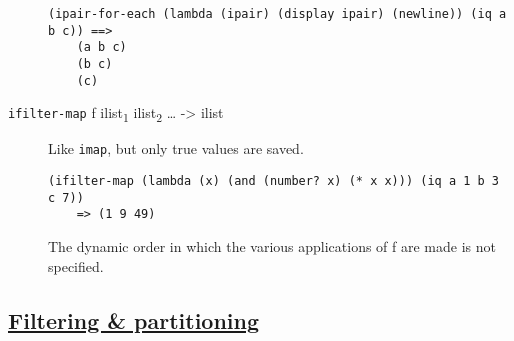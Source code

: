 \begin{description}
\begin{verbatim}
(ipair-for-each (lambda (ipair) (display ipair) (newline)) (iq a b c)) ==>
    (a b c)
    (b c)
    (c)
\end{verbatim}
\item[ \href{}{} \texttt{ifilter-map} f ilist\textsubscript{1}
ilist\textsubscript{2} \ldots{} -\textgreater{} ilist ]
Like \texttt{imap}, but only true values are saved.

\begin{verbatim}
(ifilter-map (lambda (x) (and (number? x) (* x x))) (iq a 1 b 3 c 7))
    => (1 9 49)
\end{verbatim}

The dynamic order in which the various applications of f are made is not
specified.
\end{description}

\subsection{\texorpdfstring{\href{}{Filtering \&
partitioning}}{Filtering \& partitioning}}\label{filtering-partitioning}

